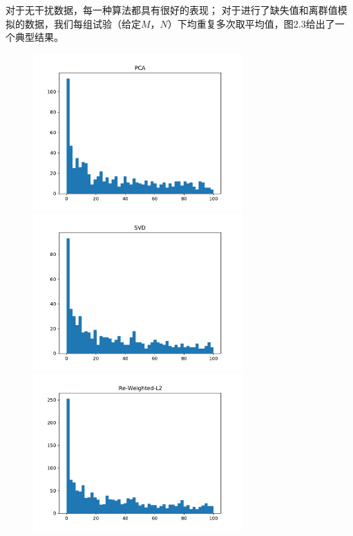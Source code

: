 对于无干扰数据，每一种算法都具有很好的表现；
对于进行了缺失值和离群值模拟的数据，我们每组试验（给定$M$，$ N$）下均重复多次取平均值，图2.3给出了一个典型结果。
\begin{figure}[H]
    \centering
    \begin{minipage}[t]{0.48\textwidth}
    \includegraphics[width=8cm]{pics/lab1/pca-ab.pdf}
    \end{minipage}
    \begin{minipage}[t]{0.48\textwidth}
    \includegraphics[width=8cm]{pics/lab1/svd-ab.pdf}
    \end{minipage}
    \begin{minipage}[t]{0.48\textwidth}
    \includegraphics[width=8cm]{pics/lab1/l2-ab.pdf}
    \end{minipage}
    \begin{minipage}[t]{0.48\textwidth}

\end{minipage}
\end{figure}
